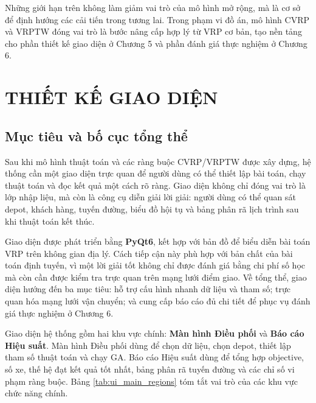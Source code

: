 \documentclass[12pt,a4paper]{article}
\numberwithin{figure}{subsection}
\numberwithin{table}{subsection}
\begin{document}
Những giới hạn trên không làm giảm vai trò của mô hình mở rộng, mà là cơ sở để định hướng các cải tiến trong tương lai. Trong phạm vi đồ án, mô hình CVRP và VRPTW đóng vai trò là bước nâng cấp hợp lý từ VRP cơ bản, tạo nền tảng cho phần thiết kế giao diện ở Chương 5 và phần đánh giá thực nghiệm ở Chương 6.


\section{THIẾT KẾ GIAO DIỆN}

\subsection{Mục tiêu và bố cục tổng thể}

Sau khi mô hình thuật toán và các ràng buộc CVRP/VRPTW được xây dựng, hệ thống cần một giao diện trực quan để người dùng có thể thiết lập bài toán, chạy thuật toán và đọc kết quả một cách rõ ràng. Giao diện không chỉ đóng vai trò là lớp nhập liệu, mà còn là công cụ diễn giải lời giải: người dùng có thể quan sát depot, khách hàng, tuyến đường, biểu đồ hội tụ và bảng phân rã lịch trình sau khi thuật toán kết thúc.

Giao diện được phát triển bằng \textbf{PyQt6}, kết hợp với bản đồ để biểu diễn bài toán VRP trên không gian địa lý. Cách tiếp cận này phù hợp với bản chất của bài toán định tuyến, vì một lời giải tốt không chỉ được đánh giá bằng chi phí số học mà còn cần được kiểm tra trực quan trên mạng lưới điểm giao. Về tổng thể, giao diện hướng đến ba mục tiêu: hỗ trợ cấu hình nhanh dữ liệu và tham số; trực quan hóa mạng lưới vận chuyển; và cung cấp báo cáo đủ chi tiết để phục vụ đánh giá thực nghiệm ở Chương 6.

Giao diện hệ thống gồm hai khu vực chính: \textbf{Màn hình Điều phối} và \textbf{Báo cáo Hiệu suất}. Màn hình Điều phối dùng để chọn dữ liệu, chọn depot, thiết lập tham số thuật toán và chạy GA. Báo cáo Hiệu suất dùng để tổng hợp objective, số xe, thế hệ đạt kết quả tốt nhất, bảng phân rã tuyến đường và các chỉ số vi phạm ràng buộc. Bảng \ref{tab:ui_main_regions} tóm tắt vai trò của các khu vực chức năng chính.
\end{document}
